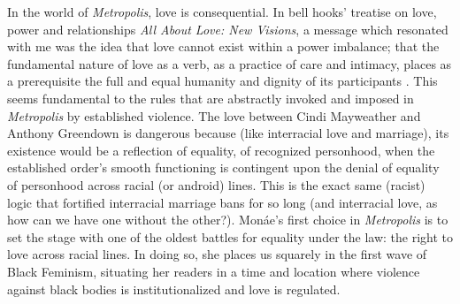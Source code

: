 \documentclass[a4paper, 11pt]{article} %
\begin{document}
In the world of \emph{Metropolis}, love is consequential.
In bell hooks' treatise on love, power and relationships \emph{All About Love: New Visions}, a message which resonated with me was the idea that love cannot exist within a power imbalance; that the fundamental nature of love as a verb, as a practice of care and intimacy, places as a prerequisite the full and equal humanity and dignity of its participants \cite{newvisions}. 
This seems fundamental to the rules that are abstractly invoked and imposed in \emph{Metropolis} by established violence. 
The love between Cindi Mayweather  and Anthony Greendown is dangerous because (like interracial love and marriage), its existence would be a reflection of equality, of recognized personhood, when the established order's smooth functioning is contingent upon the denial of equality of personhood across racial (or android) lines. 
This is the exact same (racist) logic that fortified interracial marriage bans for so long (and interracial love, as how can we have one without the other?).
Mon\'ae's first choice in \emph{Metropolis} is to set the stage with one of the oldest battles for equality under the law: the right to love across racial lines.
In doing so, she places us squarely in the first wave of Black Feminism, situating her readers in a time and location where violence against black bodies is institutionalized and love is regulated.
\end{document}
